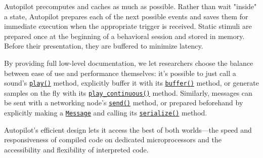 Autopilot precomputes and caches as much as possible. Rather than wait "inside" a state, Autopilot prepares each of the next possible events and saves them for immediate execution when the appropriate trigger is received. Static stimuli are prepared once at the beginning of a behavioral session and stored in memory. Before their presentation, they are buffered to minimize latency.

By providing full low-level documentation, we let researchers choose the balance between ease of use and performance themselves: it's possible to just call a sound's \texttt{\href{https://docs.auto-pi-lot.com/en/latest/stim/sound/base.html\#autopilot.stim.sound.base.Jack_Sound.play}{play()}} method, explicitly buffer it with its \texttt{\href{https://docs.auto-pi-lot.com/en/latest/stim/sound/base.html\#autopilot.stim.sound.base.Jack_Sound.buffer}{buffer()}} method, or generate samples on the fly with its \texttt{\href{https://docs.auto-pi-lot.com/en/latest/stim/sound/base.html\#autopilot.stim.sound.base.Jack_Sound.play_continuous}{play\_continuous()}} method. Similarly, messages can be sent with a networking node's \texttt{\href{https://docs.auto-pi-lot.com/en/latest/networking/node.html\#autopilot.networking.node.Net_Node.send}{send()}} method, or prepared beforehand by explicitly making a \texttt{\href{https://docs.auto-pi-lot.com/en/latest/networking/message.html\#autopilot.networking.message.Message}{Message}} and calling its \texttt{\href{https://docs.auto-pi-lot.com/en/latest/networking/message.html\#autopilot.networking.message.Message.serialize}{serialize()}} method.

\vspace{16pt}

Autopilot's efficient design lets it access the best of both worlds---the speed and responsiveness of compiled code on dedicated microprocessors and the accessibility and flexibility of interpreted code.